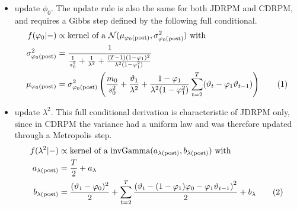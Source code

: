 \documentclass[12pt,	%
	a4paper,		%
	twoside,		%
	openright,		%
	titlepage,%
	]{book}
\newcommand\numberthis{\addtocounter{equation}{1}\tag{\theequation}}
\theoremstyle{definition}
\begin{document}
\begin{itemize}
\item update $\phi_0$. The update rule is also the same for both JDRPM and CDRPM, and requires a Gibbs step defined by the following full conditional.
\begin{align*}
     f(\phi_0|-) &\propto \text{kernel of a $\N(\mu_{\phi_0\post},\sigma^{2}_{\phi_0\post})$ with}\\
    \sigma^{2}_{\postp{\phi_0}} &= \dfrac{1}{\frac{1}{s_0^2}+\frac{1}{\lambda^2}+\frac{(T-1)(1-\phi_1)^2}{\lambda^2(1-\phi_1^2)}}\\
    \mu_{\phi_0\post} &= \sigma^{2}_{\phi_0\post} \left(\dfrac{m_0}{s_0^2}+\dfrac{\theta_1}{\lambda^2}+\dfrac{1-\phi_1}{\lambda^2(1-\phi_1^2)}\sum_{t=2}^T(\theta_t-\phi_1\theta_{t-1})\right)
 \numberthis \label{update phi0}
\end{align*}

\item update $\lambda^2$. This full conditional derivation is characteristic of JDRPM only, since in CDRPM the variance had a uniform law and was therefore updated through a Metropolis step. 
\begin{align*}
     f(\lambda^2|-)&\propto \text{kernel of a $\invgamma(a_{\postp{\lambda}}, b_{\postp{\lambda}})$ with}\\
a_{\postp{\lambda}}&=\frac{T}{2}+a_\lambda\\
%
b_{\postp{\lambda}}&=  \frac{(\theta_1-\phi_0)^2}{2}
 + \sum_{t=2}^T \frac{\left( \theta_t - (1-\phi_1)\phi_0 -\phi_1\theta_{t-1}\right)^2}{2}+b_\lambda
 \numberthis \label{update lambda2}
\end{align*}


\end{itemize}
\end{document}
